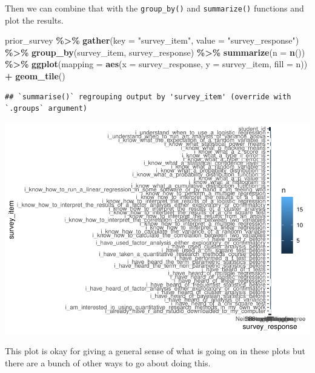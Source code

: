 \documentclass[
]{book}
\newenvironment{Shaded}{\begin{snugshade}}{\end{snugshade}}
\newcommand{\DataTypeTok}[1]{\textcolor[rgb]{0.13,0.29,0.53}{#1}}
\newcommand{\KeywordTok}[1]{\textcolor[rgb]{0.13,0.29,0.53}{\textbf{#1}}}
\newcommand{\NormalTok}[1]{#1}
\newcommand{\OperatorTok}[1]{\textcolor[rgb]{0.81,0.36,0.00}{\textbf{#1}}}
\newcommand{\StringTok}[1]{\textcolor[rgb]{0.31,0.60,0.02}{#1}}
\begin{document}
Then we can combine that with the \texttt{group\_by()} and \texttt{summarize()} functions and plot the results.

\begin{Shaded}
\begin{Highlighting}[]
\NormalTok{prior\_survey }\OperatorTok{\%\textgreater{}\%}\StringTok{ }
\StringTok{  }\KeywordTok{gather}\NormalTok{(}\DataTypeTok{key =} \StringTok{"survey\_item"}\NormalTok{, }\DataTypeTok{value =} \StringTok{"survey\_response"}\NormalTok{) }\OperatorTok{\%\textgreater{}\%}\StringTok{ }
\StringTok{  }\KeywordTok{group\_by}\NormalTok{(survey\_item, survey\_response) }\OperatorTok{\%\textgreater{}\%}\StringTok{ }
\StringTok{  }\KeywordTok{summarize}\NormalTok{(}\DataTypeTok{n =} \KeywordTok{n}\NormalTok{()) }\OperatorTok{\%\textgreater{}\%}\StringTok{ }
\StringTok{  }\KeywordTok{ggplot}\NormalTok{(}\DataTypeTok{mapping =} \KeywordTok{aes}\NormalTok{(}\DataTypeTok{x =}\NormalTok{ survey\_response, }\DataTypeTok{y =}\NormalTok{ survey\_item, }\DataTypeTok{fill =}\NormalTok{ n)) }\OperatorTok{+}
\StringTok{  }\KeywordTok{geom\_tile}\NormalTok{()}
\end{Highlighting}
\end{Shaded}

\begin{verbatim}
## `summarise()` regrouping output by 'survey_item' (override with `.groups` argument)
\end{verbatim}

\includegraphics{test_course_notes_files/figure-latex/unnamed-chunk-10-1.pdf}

This plot is okay for giving a general sense of what is going on in these plots but there are a bunch of other ways to go about doing this.
\end{document}
